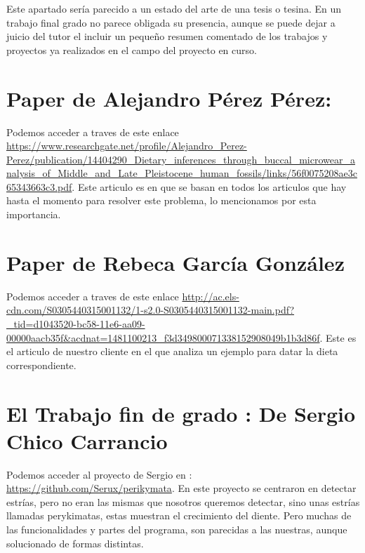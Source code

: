
Este apartado sería parecido a un estado del arte de una tesis o tesina. En un trabajo final grado no parece obligada su presencia, aunque se puede dejar a juicio del tutor el incluir un pequeño resumen comentado de los trabajos y proyectos ya realizados en el campo del proyecto en curso. 

\section{Paper de Alejandro Pérez Pérez:}
Podemos acceder a traves de este enlace \url{https://www.researchgate.net/profile/Alejandro_Perez-Perez/publication/14404290_Dietary_inferences_through_buccal_microwear_analysis_of_Middle_and_Late_Pleistocene_human_fossils/links/56f0075208ae3c65343663c3.pdf}.
Este articulo es en que se basan en todos los articulos que hay hasta el momento para resolver este problema, lo mencionamos por esta importancia.

\section{Paper de Rebeca García González}
Podemos acceder a traves de este enlace \url{http://ac.els-cdn.com/S0305440315001132/1-s2.0-S0305440315001132-main.pdf?_tid=d1043520-bc58-11e6-aa09-00000aacb35f&acdnat=1481100213_f3d349800071338152908049b1b3d86f}.
Este es el articulo de nuestro cliente en el que analiza un ejemplo para datar la dieta correspondiente.

\section{El Trabajo fin de grado : De Sergio Chico Carrancio}
Podemos acceder al proyecto de Sergio en : \url{https://github.com/Serux/perikymata}.
En este proyecto se centraron en detectar estrías, pero no eran las mismas que nosotros queremos detectar, sino unas estrías llamadas perykimatas, estas muestran el crecimiento del diente. Pero muchas de las funcionalidades y partes del programa, son parecidas a las nuestras, aunque solucionado de formas distintas.
